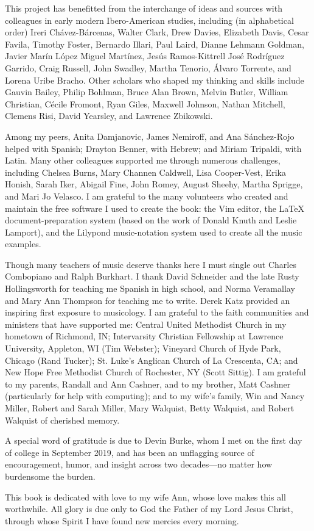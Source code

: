 This project has benefitted from the interchange of ideas and sources with
colleagues in early modern Ibero-American studies, including (in alphabetical
order)
Ireri Chávez-Bárcenas,
Walter Clark,
Drew Davies,
Elizabeth Davis,
Cesar Favila,
Timothy Foster,
Bernardo Illari,
Paul Laird,
Dianne Lehmann Goldman,
Javier Marín López
Miguel Martínez, 
Jesús Ramos-Kittrell
José Rodríguez Garrido, 
Craig Russell,
John Swadley,
Martha Tenorio, 
Álvaro Torrente,
and 
Lorena Uribe Bracho.
Other scholars who shaped my thinking and skills include 
Gauvin Bailey, 
Philip Bohlman, 
Bruce Alan Brown,
Melvin Butler, 
William Christian, 
Cécile Fromont, 
Ryan Giles, 
Maxwell Johnson, 
Nathan Mitchell,
Clemens Risi,
David Yearsley, 
and
Lawrence Zbikowski.

Among my peers, Anita Damjanovic, James Nemiroff, and Ana Sánchez-Rojo helped
with Spanish; Drayton Benner, with Hebrew; and Miriam Tripaldi, with Latin.
Many other colleagues supported me through numerous challenges,
including 
Chelsea Burns,
Mary Channen Caldwell,
Lisa Cooper-Vest,
Erika Honish, 
Sarah Iker,
Abigail Fine,
John Romey,
August Sheehy, 
Martha Sprigge,
and
Mari Jo Velasco.
I am grateful to the many volunteers who created and maintain the free
software I used to create the book: the Vim editor, the \LaTeX{}
document-preparation system (based on the work of Donald Knuth and Leslie
Lamport), and the Lilypond music-notation system used to create all the music
examples.

Though many teachers of music deserve thanks here I must single out Charles
Combopiano and Ralph Burkhart.
I thank David Schneider and the late Rusty Hollingsworth for teaching me
Spanish in high school, and Norma Veramallay and Mary Ann Thompson for
teaching me to write.
Derek Katz provided an inspiring first exposure to musicology.
I am grateful to the faith communities and ministers that have supported me:
Central United Methodist Church in my hometown of Richmond, IN; Intervarsity
Christian Fellowship at Lawrence University, Appleton, WI (Tim Webster);
Vineyard Church of Hyde Park, Chicago (Rand Tucker); St. Luke's Anglican
Church of La Crescenta, CA; and New Hope Free Methodist Church of Rochester,
NY (Scott Sittig).
I am grateful to my parents, Randall and Ann Cashner, and to my brother, Matt
Cashner (particularly for help with computing); and to my wife's family, Win
and Nancy Miller, Robert and Sarah Miller, Mary Walquist, Betty Walquist,
and Robert Walquist of cherished memory.

A special word of gratitude is due to Devin Burke, whom I met on the first day
of college in September 2019, and has been an unflagging source of
encouragement, humor, and insight across two decades---no matter how
burdensome the burden.

This book is dedicated with love to my wife Ann, whose love makes this all
worthwhile.
All glory is due only to God the Father of my Lord Jesus Christ, through whose
Spirit I have found new mercies every morning.

\endinput
